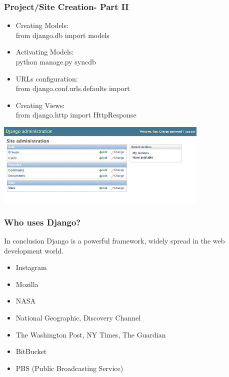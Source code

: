 \documentclass{beamer}
\begin{document}
\begin{frame}
\frametitle{Project/Site Creation- Part II}
\begin{itemize}
  \item Creating Models:  \hfill\\ \hspace{35pt} from django.db import models 

  \item Activating Models:  \hfill\\ \hspace{35pt} python manage.py syncdb

  \item URLs configuration: \hfill\\ \hspace{35pt} from django.conf.urls.defaults import
		  
	\item Creating Views: \hfill\\ \hspace{35pt} from django.http import HttpResponse
			

\end{itemize}
\begin{center}
\includegraphics[height = 4cm]{admin.jpg}
\end{center}
\end{frame}

\begin{frame}
\frametitle{Who uses Django?}
\begin{flushleft}
	In conclusion Django is a powerful framework, widely spread in the web development world.
\end{flushleft}
\begin{itemize}
	\item Instagram
	
	\item Mozilla
	
	\item NASA
	
	\item National Geographic, Discovery Channel
	
	\item The Washington Post, NY Times, The Guardian
	
	\item BitBucket
	
	\item PBS (Public Broadcasting Service)

\end{itemize}
\end{frame}
\end{document}
